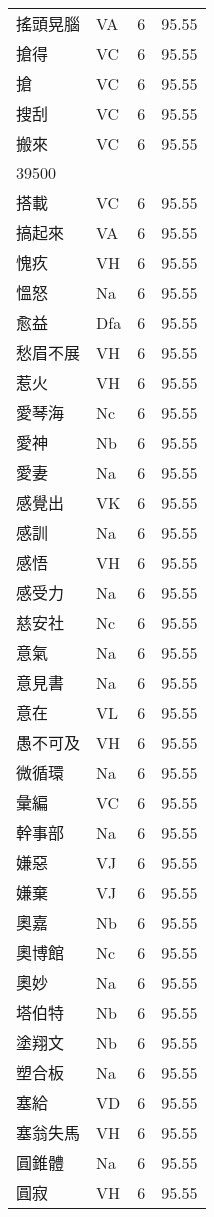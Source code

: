 \documentclass[twocolumn]{book}
\begin{document}
\begin{supertabular}{llrr}
搖頭晃腦 & VA & 6 &  95.55\\
搶得 & VC & 6 &  95.55\\
搶 & VC & 6 &  95.55\\
搜刮 & VC & 6 &  95.55\\
搬來 & VC & 6 &  95.55\\
39500\\
搭載 & VC & 6 &  95.55\\
搞起來 & VA & 6 &  95.55\\
愧疚 & VH & 6 &  95.55\\
慍怒 & Na & 6 &  95.55\\
愈益 & Dfa & 6 &  95.55\\
愁眉不展 & VH & 6 &  95.55\\
惹火 & VH & 6 &  95.55\\
愛琴海 & Nc & 6 &  95.55\\
愛神 & Nb & 6 &  95.55\\
愛妻 & Na & 6 &  95.55\\
感覺出 & VK & 6 &  95.55\\
感訓 & Na & 6 &  95.55\\
感悟 & VH & 6 &  95.55\\
感受力 & Na & 6 &  95.55\\
慈安社 & Nc & 6 &  95.55\\
意氣 & Na & 6 &  95.55\\
意見書 & Na & 6 &  95.55\\
意在 & VL & 6 &  95.55\\
愚不可及 & VH & 6 &  95.55\\
微循環 & Na & 6 &  95.55\\
彙編 & VC & 6 &  95.55\\
幹事部 & Na & 6 &  95.55\\
嫌惡 & VJ & 6 &  95.55\\
嫌棄 & VJ & 6 &  95.55\\
奧嘉 & Nb & 6 &  95.55\\
奧博館 & Nc & 6 &  95.55\\
奧妙 & Na & 6 &  95.55\\
塔伯特 & Nb & 6 &  95.55\\
塗翔文 & Nb & 6 &  95.55\\
塑合板 & Na & 6 &  95.55\\
塞給 & VD & 6 &  95.55\\
塞翁失馬 & VH & 6 &  95.55\\
圓錐體 & Na & 6 &  95.55\\
圓寂 & VH & 6 &  95.55\\

\end{supertabular}
\end{document}
